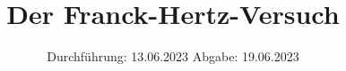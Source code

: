 

\subject{V601}
\title{Der Franck-Hertz-Versuch}
\date{%
  Durchführung: 13.06.2023
  \hspace{3em}
  Abgabe: 19.06.2023
}



\maketitle
\thispagestyle{empty}
\tableofcontents
\newpage






\printbibliography{}



